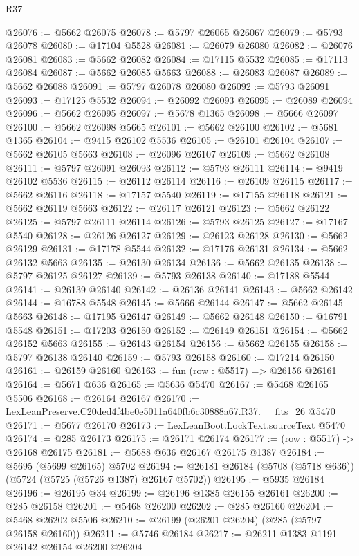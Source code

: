 \begin{lexlean}{R37}
\begin{coremodule}
@26076 := @5662 @26075
@26078 := @5797 @26065 @26067
@26079 := @5793 @26078
@26080 := @17104 @5528
@26081 := @26079 @26080
@26082 := @26076 @26081
@26083 := @5662 @26082
@26084 := @17115 @5532
@26085 := @17113 @26084
@26087 := @5662 @26085 @5663
@26088 := @26083 @26087
@26089 := @5662 @26088
@26091 := @5797 @26078 @26080
@26092 := @5793 @26091
@26093 := @17125 @5532
@26094 := @26092 @26093
@26095 := @26089 @26094
@26096 := @5662 @26095
@26097 := @5678 @1365
@26098 := @5666 @26097
@26100 := @5662 @26098 @5665
@26101 := @5662 @26100
@26102 := @5681 @1365
@26104 := @9415 @26102 @5536
@26105 := @26101 @26104
@26107 := @5662 @26105 @5663
@26108 := @26096 @26107
@26109 := @5662 @26108
@26111 := @5797 @26091 @26093
@26112 := @5793 @26111
@26114 := @9419 @26102 @5536
@26115 := @26112 @26114
@26116 := @26109 @26115
@26117 := @5662 @26116
@26118 := @17157 @5540
@26119 := @17155 @26118
@26121 := @5662 @26119 @5663
@26122 := @26117 @26121
@26123 := @5662 @26122
@26125 := @5797 @26111 @26114
@26126 := @5793 @26125
@26127 := @17167 @5540
@26128 := @26126 @26127
@26129 := @26123 @26128
@26130 := @5662 @26129
@26131 := @17178 @5544
@26132 := @17176 @26131
@26134 := @5662 @26132 @5663
@26135 := @26130 @26134
@26136 := @5662 @26135
@26138 := @5797 @26125 @26127
@26139 := @5793 @26138
@26140 := @17188 @5544
@26141 := @26139 @26140
@26142 := @26136 @26141
@26143 := @5662 @26142
@26144 := @16788 @5548
@26145 := @5666 @26144
@26147 := @5662 @26145 @5663
@26148 := @17195 @26147
@26149 := @5662 @26148
@26150 := @16791 @5548
@26151 := @17203 @26150
@26152 := @26149 @26151
@26154 := @5662 @26152 @5663
@26155 := @26143 @26154
@26156 := @5662 @26155
@26158 := @5797 @26138 @26140
@26159 := @5793 @26158
@26160 := @17214 @26150
@26161 := @26159 @26160
@26163 := fun (row : @5517) => @26156 @26161
@26164 := @5671 @636
@26165 := @5636 @5470
@26167 := @5468 @26165 @5506
@26168 := @26164 @26167
@26170 := LexLeanPreserve.C20ded4f4be0e5011a640fb6c30888a67.R37.__fits_26 @5470
@26171 := @5677 @26170
@26173 := LexLeanBoot.LockText.sourceText @5470
@26174 := @285 @26173
@26175 := @26171 @26174
@26177 := (row : @5517) -> @26168 @26175
@26181 := @5688 @636 @26167 @26175 @1387
@26184 := @5695 (@5699 @26165) @5702
@26194 := @26181 @26184 (@5708 (@5718 @636)) (@5724 (@5725 (@5726 @1387) @26167 @5702))
@26195 := @5935 @26184
@26196 := @26195 @34
@26199 := @26196 @1385 @26155 @26161
@26200 := @285 @26158
@26201 := @5468 @26200
@26202 := @285 @26160
@26204 := @5468 @26202 @5506
@26210 := @26199 (@26201 @26204) (@285 (@5797 @26158 @26160))
@26211 := @5746 @26184
@26217 := @26211 @1383 @1191 @26142 @26154 @26200 @26204

\end{coremodule}
\end{lexlean}

